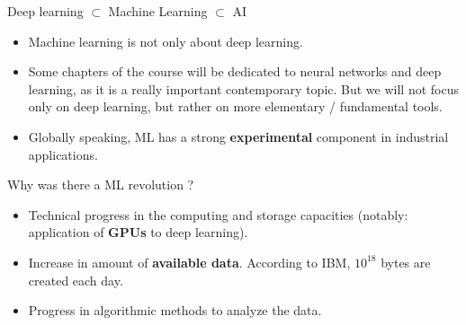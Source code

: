 \documentclass[usenames,dvipsnames]{beamer}
\begin{document}
\begin{frame}{Deep learning $\subset$ Machine Learning $\subset$ AI}

	\begin{itemize}
		\item Machine learning is not only about deep learning.
		\item Some chapters of the course will be dedicated to neural networks and deep learning, as it is a really important contemporary topic. But we will not focus only on deep learning, but rather on more elementary / fundamental tools. 
		\item Globally speaking, ML has a strong \textbf{experimental} component in industrial applications.
	\end{itemize}
\end{frame}

%

\begin{frame}{Why was there a ML revolution ?}
\begin{itemize}
    \item Technical progress in the computing and storage capacities (notably: application of \textbf{GPUs} to deep learning).
    \item Increase in amount of \textbf{available data}. According to IBM, $10^{18}$
        bytes are created each day.
    \item Progress in algorithmic methods to analyze the data.
\end{itemize}
    
\end{frame}
\end{document}
